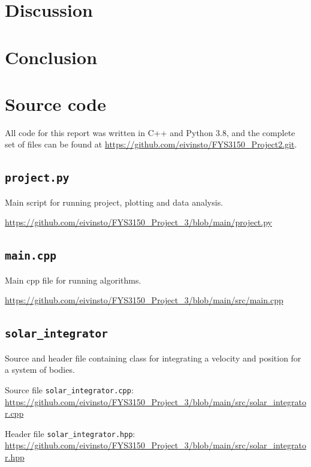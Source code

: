 \documentclass[reprint,english,notitlepage]{revtex4-1}  %
\begin{document}
\section{Discussion} \label{sec:V}




\section{Conclusion} \label{sec:VI}





\onecolumngrid
{}
\newpage
\twocolumngrid

\appendix
\section{Source code} \label{A}
All code for this report was written in C++ and Python 3.8, and the complete set of files can be found at
\url{https://github.com/eivinsto/FYS3150_Project2.git}.

\cprotect\subsection{\verb+project.py+} \label{A.1}
Main script for running project, plotting and data analysis.

\url{https://github.com/eivinsto/FYS3150_Project_3/blob/main/project.py}

\cprotect\subsection{\verb+main.cpp+} \label{A.2}
Main cpp file for running algorithms.

\url{https://github.com/eivinsto/FYS3150_Project_3/blob/main/src/main.cpp}

\cprotect\subsection{\verb+solar_integrator+} \label{A.3}
Source and header file containing class for integrating a velocity and position for a system of bodies.

Source file \verb+solar_integrator.cpp+:
\url{https://github.com/eivinsto/FYS3150_Project_3/blob/main/src/solar_integrator.cpp}

Header file \verb+solar_integrator.hpp+:
\url{https://github.com/eivinsto/FYS3150_Project_3/blob/main/src/solar_integrator.hpp}
\end{document}
